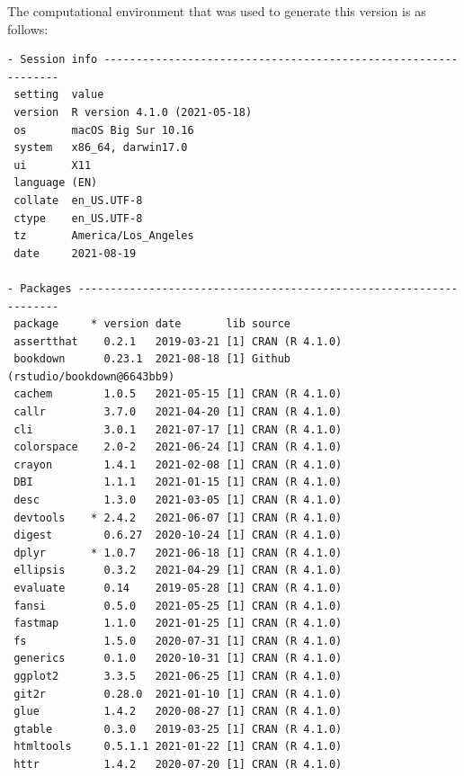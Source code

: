 \documentclass [11pt, proquest] {uwthesis}[2015/03/03]
\begin{document}
The computational environment that was used to generate this version is as follows:
\begin{verbatim}
- Session info ---------------------------------------------------------------
 setting  value                       
 version  R version 4.1.0 (2021-05-18)
 os       macOS Big Sur 10.16         
 system   x86_64, darwin17.0          
 ui       X11                         
 language (EN)                        
 collate  en_US.UTF-8                 
 ctype    en_US.UTF-8                 
 tz       America/Los_Angeles         
 date     2021-08-19                  

- Packages -------------------------------------------------------------------
 package     * version date       lib source                               
 assertthat    0.2.1   2019-03-21 [1] CRAN (R 4.1.0)                       
 bookdown      0.23.1  2021-08-18 [1] Github (rstudio/bookdown@6643bb9)    
 cachem        1.0.5   2021-05-15 [1] CRAN (R 4.1.0)                       
 callr         3.7.0   2021-04-20 [1] CRAN (R 4.1.0)                       
 cli           3.0.1   2021-07-17 [1] CRAN (R 4.1.0)                       
 colorspace    2.0-2   2021-06-24 [1] CRAN (R 4.1.0)                       
 crayon        1.4.1   2021-02-08 [1] CRAN (R 4.1.0)                       
 DBI           1.1.1   2021-01-15 [1] CRAN (R 4.1.0)                       
 desc          1.3.0   2021-03-05 [1] CRAN (R 4.1.0)                       
 devtools    * 2.4.2   2021-06-07 [1] CRAN (R 4.1.0)                       
 digest        0.6.27  2020-10-24 [1] CRAN (R 4.1.0)                       
 dplyr       * 1.0.7   2021-06-18 [1] CRAN (R 4.1.0)                       
 ellipsis      0.3.2   2021-04-29 [1] CRAN (R 4.1.0)                       
 evaluate      0.14    2019-05-28 [1] CRAN (R 4.1.0)                       
 fansi         0.5.0   2021-05-25 [1] CRAN (R 4.1.0)                       
 fastmap       1.1.0   2021-01-25 [1] CRAN (R 4.1.0)                       
 fs            1.5.0   2020-07-31 [1] CRAN (R 4.1.0)                       
 generics      0.1.0   2020-10-31 [1] CRAN (R 4.1.0)                       
 ggplot2       3.3.5   2021-06-25 [1] CRAN (R 4.1.0)                       
 git2r         0.28.0  2021-01-10 [1] CRAN (R 4.1.0)                       
 glue          1.4.2   2020-08-27 [1] CRAN (R 4.1.0)                       
 gtable        0.3.0   2019-03-25 [1] CRAN (R 4.1.0)                       
 htmltools     0.5.1.1 2021-01-22 [1] CRAN (R 4.1.0)                       
 httr          1.4.2   2020-07-20 [1] CRAN (R 4.1.0)                       

\end{verbatim}
\end{document}
